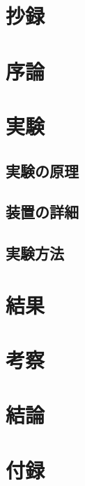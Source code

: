 \documentclass[11pt, a4paper, dvipdfmx]{jsarticle}
\title{}
\author{}
\date{}
\begin{document}
\maketitle

\section{抄録}

\section{序論}

\section{実験}

\subsection{実験の原理}

\subsection{装置の詳細}

\subsection{実験方法}

\section{結果}

\section{考察}

\section{結論}




\section*{付録}
\end{document}
